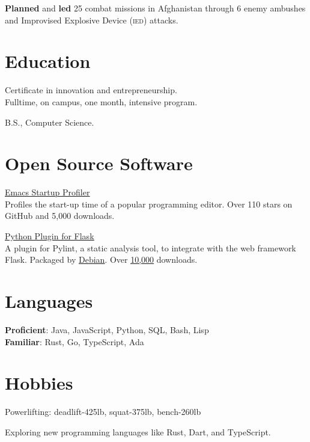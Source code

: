 \documentclass[letterpaper,11pt]{sound-resume}
\newcommand*{\action}[1]{\textbf{#1}}
\newcommand*{\abbrevparen}[1]{{\footnotesize (}\textsc{#1}{\footnotesize )}}
\begin{document}
\begin{paracol}{2}
\begin{workitems}
\item \action{Planned} and \action{led} 25 combat missions in Afghanistan
  through 6 enemy ambushes and Improvised Explosive Device \abbrevparen{ied} attacks.
\end{workitems}

\section*{Education}

Certificate in innovation and entrepreneurship.\\
Fulltime, on campus, one month, intensive program.

B.S., Computer Science.

\switchcolumn

\section*{Open Source Software}

\href{https://github.com/jschaf/esup}{\ul{Emacs Startup Profiler}}\\
Profiles the start-up time of a popular programming editor.  Over 110 stars on
GitHub and 5,000 downloads.

\href{https://github.com/jschaf/pylint-flask}{\ul{Python Plugin for Flask}}\\
A plugin for Pylint, a static analysis tool, to integrate with the web framework
Flask.  Packaged by
\href{https://packages.debian.org/sid/main/python3-pylint-flask}{\ul{Debian}}.  Over
\href{http://pypi-ranking.info/module/pylint-flask}{\ul{10,000}} downloads.


\section*{Languages}
\textbf{Proficient}: Java, JavaScript, Python, SQL, Bash, Lisp\\[6pt]
\textbf{Familiar}: Rust, Go, TypeScript, Ada

\section*{Hobbies}
Powerlifting: deadlift-425lb, squat-375lb, bench-260lb

Exploring new programming languages like Rust, Dart, and TypeScript.

\end{paracol}

\end{document}
